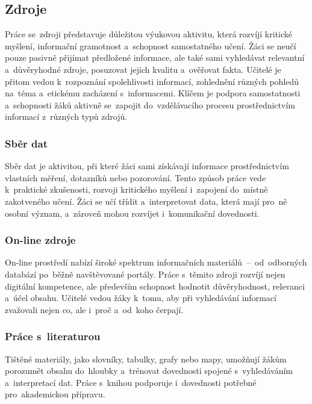 \documentclass[male,czech,api_bc]{kitheses}
\begin{document}
\subsection{Zdroje}

Práce se~zdroji představuje důležitou výukovou aktivitu, která rozvíjí kritické myšlení, informační gramotnost a~schopnost samostatného učení. Žáci se neučí pouze pasivně přijímat předložené informace, ale také sami vyhledávat relevantní a~důvěryhodné zdroje, posuzovat jejich kvalitu a~ověřovat fakta. Učitelé je přitom vedou k~rozpoznání spolehlivosti informací, zohlednění různých pohledů na~téma a~etickému zacházení s~informacemi. Klíčem je podpora samostatnosti a~schopnosti žáků aktivně se~zapojit do~vzdělávacího procesu prostřednictvím informací z~různých typů zdrojů.\cite{eduPraceSeZdroji}

\subsubsection{Sběr dat}

Sběr dat je aktivitou, při které žáci sami získávají informace prostřednictvím vlastních měření, dotazníků nebo pozorování. Tento způsob práce vede k~praktické zkušenosti, rozvoji kritického myšlení i~zapojení do~místně zakotveného učení. Žáci se učí třídit a~interpretovat data, která mají pro~ně osobní význam, a~zároveň mohou rozvíjet i~komunikační dovednosti.\cite{eduSberDat}

\subsubsection{On-line zdroje}

On-line prostředí nabízí široké spektrum informačních materiálů~--~od~odborných databází po~běžně navštěvované portály. Práce s~těmito zdroji rozvíjí nejen digitální kompetence, ale především schopnost hodnotit důvěryhodnost, relevanci a~účel obsahu. Učitelé vedou žáky k~tomu, aby při vyhledávání informací zvažovali nejen co, ale i~proč a~od~koho čerpají.\cite{eduOnlineZdroje}

\subsubsection{Práce s~literaturou}

Tištěné materiály, jako slovníky, tabulky, grafy nebo mapy, umožňují žákům porozumět obsahu do~hloubky a~trénovat dovednosti spojené s~vyhledáváním a~interpretací dat. Práce s~knihou podporuje i~dovednosti potřebné pro~akademickou přípravu.\cite{eduPraceSLiteraturou}
\end{document}
